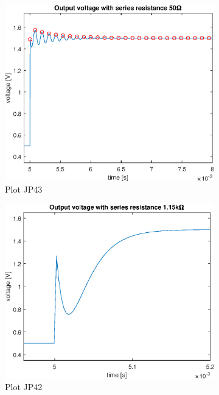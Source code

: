 \documentclass[notitlepage, a4paper, 11pt]{article}
\begin{document}
		\begin{figure}[H]
		\centering
		\begin{subfigure}{0.45 \textwidth}
			\includegraphics[width=\textwidth]{../Matlab/img/CircuitC3out}
			\caption{Plot JP43}
		\end{subfigure}
		\hfill
		\begin{subfigure}{0.45 \textwidth}
			\includegraphics[width=\textwidth]{../Matlab/img/CircuitC2out}
			\caption{Plot JP42}
		\end{subfigure}
		\hfill
		\begin{subfigure}{0.45 \textwidth}

\end{subfigure}
\end{figure}
\end{document}
